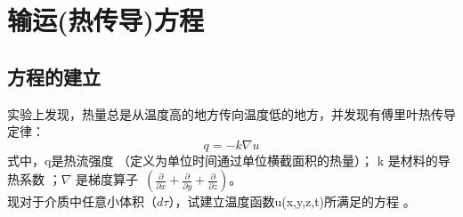
\section{输运(热传导)方程}
\subsection{方程的建立}
\begin{example} %
实验上发现，热量总是从温度高的地方传向温度低的地方，并发现有傅里叶热传导定律：
\begin{equation*}
q=-k\nabla u
\end{equation*}
式中，q是热流强度 （定义为单位时间通过单位横截面积的热量）； k 是材料的导热系数 ；$\nabla $ 是梯度算子~$(\frac{\partial }{\partial x} +\frac{\partial }{\partial y} +\frac{\partial }{\partial z})$。\\
现对于介质中任意小体积（$d\tau $），试建立温度函数u(x,y,z,t)所满足的方程 。\\
~~~\hspace*{\fill} \\

\end{example}
 \opencutright 
\def\windowpagestuff{\flushright 
\begin{tikzpicture}[math3d]
	\def\k{1.5}
	\draw [ ->] (-\k,-\k,-\k) --  (\k,-\k,-\k)  node[below] {$z$};
	\draw [ ->]  (-\k,-\k,-\k) -- (-\k, \k,-\k)   node[above] {$x$};
	\draw [ ->]  (-\k,-\k,-\k) -- (-\k,-\k, \k)    node[left] {$y$};
	 \def\a{0.5}
	\def\b{0.5}
	\def\c{0.5}
	\coordinate (A01) at ( \a, \b, \c);
	\coordinate (A02) at ( \a,-\b, \c);
	\coordinate (A03) at (-\a,-\b, \c);
	\coordinate (A04) at (-\a, \b, \c);
	\coordinate (A05) at ( \a, \b,-\c);
	\coordinate (A06) at ( \a,-\b,-\c);
	\coordinate (A07) at (-\a,-\b,-\c);
	\coordinate (A08) at (-\a, \b,-\c);
	\draw(A01)--(A02)--(A03)--(A04)--cycle;
	\draw(A06)--(A05)--(A08);
	\draw[dash dot](A06)--(A07)--(A08);
	\draw(A01)--(A05)(A02)--(A06)(A04)--(A08);
	\draw[dash dot](A03)--(A07);
    \draw[line width =1pt]  (-\k,-1,-\k) node[below] {$x$}-- (-\k, 0.0,-\k)  node[below] {$x+dx$}; 
\end{tikzpicture}}

